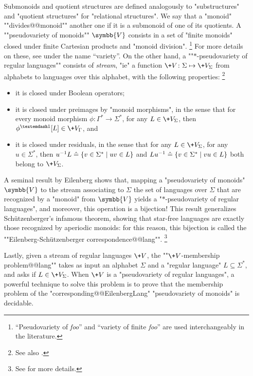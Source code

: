 Submonoids and quotient structures are defined analogously to
"substructures" and "quotient structures" for "relational structures".
We say that a "monoid" \AP""divides@@monoid"" another one if it is
a submonoid of one of its quotients.
A \AP""pseudovariety of monoids"" $\symbb{V}$%
consists in a set of "finite monoids" closed under finite Cartesian products
and "monoid division".%
\footnote{``Pseudovariety of \emph{foo}'' and ``variety of finite \emph{foo}''
are used interchangeably in the literature.}
For more details on these,
see \cite[\S XI.1, p.~189]{Pin2022MathematicalFoundations} under the name ``variety''.
On the other hand, a ""$\ast$-pseudovariety of regular languages""
consists of \emph{stream}, "ie" a function $\+V\colon \Sigma \mapsto \+V_{\Sigma}$ from alphabets to languages over this alphabet, with the following properties:%
\footnote{See also \cite[\S XIII.3, p.~226]{Pin2022MathematicalFoundations}.}
\begin{itemize}
	\item it is closed under Boolean operators;
	\item it is closed under preimages by "monoid morphisms", in the sense that
		for every monoid morphism $\phi\colon \Gamma^* \to \Sigma^*$, for any $L \in \+V_{\Sigma}$,
		then $\phi^{—1}[L] \in \+V_{\Gamma}$, and
	\item it is closed under residuals, in the sense that for any $L \in \+V_{\Sigma}$,
		for any $u\in\Sigma^*$, then
		$u^{-1}L \mathrel{\hat{=}} \{v \in \Sigma^* \mid uv \in L\}$
		and $Lu^{-1} \mathrel{\hat{=}} \{v \in \Sigma^* \mid vu \in L\}$
		both belong to $\+V_{\Sigma}$.
\end{itemize}
A seminal result by Eilenberg shows that, mapping a "pseudovariety of monoids" $\symbb{V}$
to the stream associating to $\Sigma$ the set of languages over $\Sigma$ that are recognized
by a "monoid" from $\symbb{V}$ yields a "$*$-pseudovariety of regular languages",
and moreover, this operation is a bijection!
This result generalizes Schützenberger's infamous theorem, showing that
star-free languages are exactly those recognized by aperiodic monoids:
for this reason, this bijection is called the \AP""Eilenberg-Schützenberger correspondence@@lang"".%
\footnote{See \cite[Theorem XIII.4.10, p.~228]{Pin2022MathematicalFoundations} for more details.}

Lastly, given a stream of regular languages $\+V$, the \AP""$\+V$-membership problem@@lang""
takes as input an alphabet $\Sigma$ and a "regular language" $L \subseteq \Sigma^*$,
and asks if $L \in \+V_{\Sigma}$. When $\+V$ is a "pseudovariety of regular languages",
a powerful technique to solve this problem is to prove that the membership problem
of the "corresponding@@EilenbergLang" "pseudovariety of monoids" is decidable.

